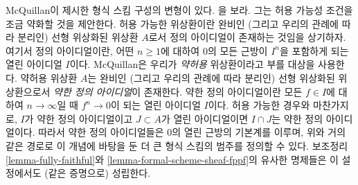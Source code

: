 \begin{remark}[McQuillan의 변형]
\label{remark-mcquillan}
McQuillan이 제시한 형식 스킴 구성의 변형이 있다. \cite{McQuillan}을
보라. 그는 허용 가능성 조건을 조금 약화할 것을 제안한다.
허용 가능한 위상환이란 완비인 (그리고 우리의 관례에 따라 분리인)
선형 위상화된 위상환 $A$로서 정의 아이디얼이 존재하는 것임을
상기하자. 여기서 정의 아이디얼이란, 어떤 $n \geq 1$에 대하여
$0$의 모든 근방이 $I^n$을 포함하게 되는 열린 아이디얼 $I$이다.
McQuillan은 우리가 {\it 약허용} 위상환이라고 부를 대상을 사용한다.
약허용 위상환 $A$는 완비인 (그리고 우리의 관례에 따라 분리인)
선형 위상화된 위상환으로서 {\it 약한 정의 아이디얼}이 존재한다.
약한 정의 아이디얼이란 모든 $f \in I$에 대하여 $n \to \infty$일 때
$f^n \to 0$이 되는 열린 아이디얼 $I$이다. 허용 가능한 경우와
마찬가지로, $I$가 약한 정의 아이디얼이고 $J \subset A$가 열린
아이디얼이면 $I \cap J$는 약한 정의 아이디얼이다.
따라서 약한 정의 아이디얼들은 $0$의 열린 근방의 기본계를 이루며,
위와 거의 같은 경로로 이 개념에 바탕을 둔 더 큰 형식 스킴의 범주를
정의할 수 있다. 보조정리 \ref{lemma-fully-faithful}와
\ref{lemma-formal-scheme-sheaf-fppf}의 유사한 명제들은 이 설정에서도
(같은 증명으로) 성립한다.
\end{remark}

